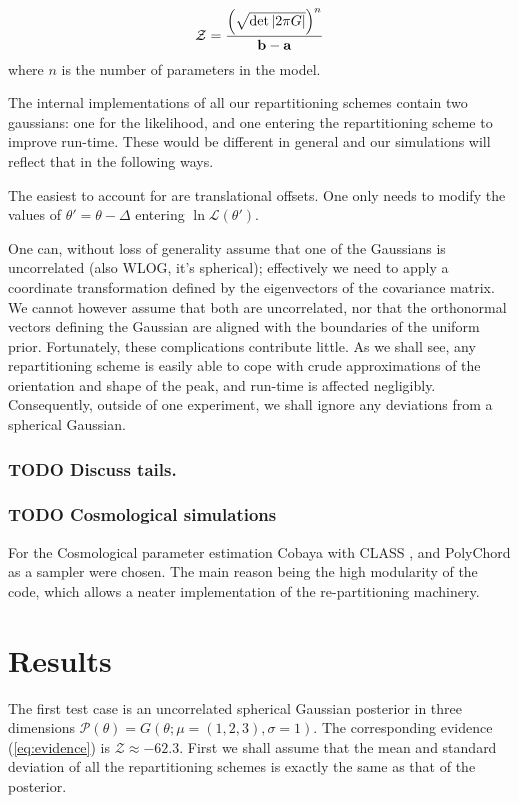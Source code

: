 \documentclass[usenatbib]{mnras}
\begin{document}
\begin{equation}\label{eq:evidence}
   {\cal Z} = \frac{\left( \sqrt{ \det \left| 2\pi G \right|} \right)^{n}}{\mathbf{b}-\mathbf{a}}  
\end{equation}
where \(n\) is the number of parameters in the model.

The internal implementations of all our repartitioning schemes
contain two gaussians: one for the likelihood, and one
entering the repartitioning scheme to improve run-time. These
would be different in general and our simulations will reflect
that in the following ways.

The easiest to account for are translational offsets. One only needs to
modify the values of \(\theta' = \theta - \Delta\) entering \(\ln
	\mathcal{L}(\theta')\). 

One can, without loss of generality assume that one of the
Gaussians is uncorrelated (also WLOG, it's spherical);
effectively we need to apply a coordinate transformation
defined by the eigenvectors of the covariance matrix. We
cannot however assume that both are uncorrelated, nor that the
orthonormal vectors defining the Gaussian are aligned with the
boundaries of the uniform prior. Fortunately, these
complications contribute little. As we shall see, any
repartitioning scheme is easily able to cope with crude
approximations of the orientation and shape of the peak, and
run-time is affected negligibly. Consequently, outside of one
experiment, we shall ignore any deviations from a spherical
Gaussian.


\subsubsection{{\bfseries\sffamily TODO} Discuss tails.}
\label{sec:orgb83755b}
\subsubsection{{\bfseries\sffamily TODO} Cosmological simulations}
\label{sec:org0636293}
For the Cosmological parameter estimation Cobaya \citep{cobaya} with
CLASS \citep{Blas_2011}, and PolyChord \citep{polychord} as a sampler
were chosen. The main reason being the high modularity of the code,
which allows a neater implementation of the re-partitioning
machinery.
\section{Results}
\label{sec:org895584f}
The first test case is an uncorrelated spherical Gaussian posterior
in three dimensions \(\mathcal{P}(\theta) = G(\theta; \mu = (1,2,3),
  \sigma = 1)\). The corresponding evidence (\autoref{eq:evidence}) is
\(\mathcal{Z}\approx-62.3\). First we shall assume that the mean and
standard deviation of all the repartitioning schemes is exactly the
same as that of the posterior. 
\end{document}
